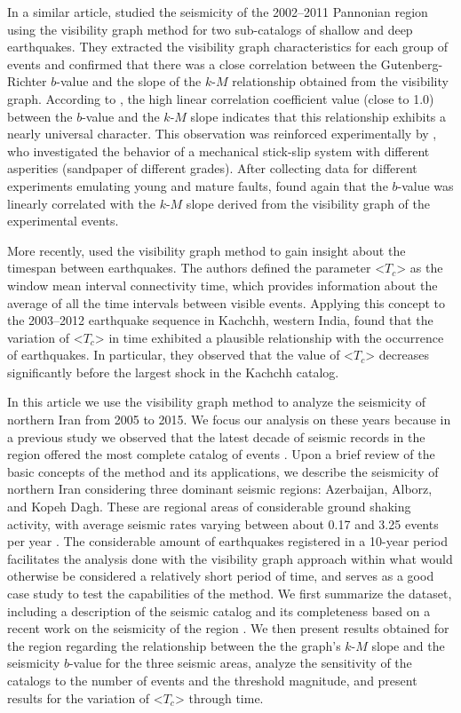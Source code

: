 In a similar article, \citet{Telesca2014} studied the seismicity of the 2002--2011 Pannonian region using the visibility graph method for two sub-catalogs of shallow and deep earthquakes. They extracted the visibility graph characteristics for each group of events and confirmed that there was a close correlation between the Gutenberg-Richter $b$-value and the slope of the $k$-$M$ relationship obtained from the visibility graph. According to \citet{Telesca2014}, the high linear correlation coefficient value (close to 1.0) between the $b$-value and the $k$-$M$ slope indicates that this relationship exhibits a nearly universal character. This observation was reinforced experimentally by \citet{Telesca2014-pone}, who investigated the behavior of a mechanical stick-slip system with different asperities (sandpaper of different grades). After collecting data for different experiments emulating young and mature faults, \citet{Telesca2014-pone} found again that the $b$-value was linearly correlated with the $k$-$M$ slope derived from the visibility graph of the experimental events.

More recently, \citet{Telesca2016} used the visibility graph method to gain insight about the timespan between earthquakes. The authors defined the parameter <$T_c$> as the window mean interval connectivity time, which provides information about the average of all the time intervals between visible events. Applying this concept to the 2003--2012 earthquake sequence in Kachchh, western India, \citet{Telesca2016} found that the variation of <$T_c$> in time exhibited a plausible relationship with the occurrence of earthquakes. In particular, they observed that the value of <$T_c$> decreases significantly before the largest shock in the Kachchh catalog.

In this article we use the visibility graph method to analyze the seismicity of northern Iran from 2005 to 2015. We focus our analysis on these years because in a previous study we observed that the latest decade of seismic records in the region offered the most complete catalog of events \citep[e.g.][]{Khoshnevis2016}. Upon a brief review of the basic concepts of the method and its applications, we describe the seismicity of northern Iran considering three dominant seismic regions: Azerbaijan, Alborz, and Kopeh Dagh. These are regional areas of considerable ground shaking activity, with average seismic rates varying between about 0.17 and 3.25 events per year \citep[e.g.,][]{Nemati2015}. The considerable amount of earthquakes registered in a 10-year period facilitates the analysis done with the visibility graph approach within what would otherwise be considered a relatively short period of time, and serves as a good case study to test the capabilities of the method. We first summarize the dataset, including a description of the seismic catalog and its completeness based on a recent work on the seismicity of the region \citep{Khoshnevis2016}. We then present results obtained for the region regarding the relationship between the the graph's $k$-$M$ slope and the seismicity $b$-value for the three seismic areas, analyze the sensitivity of the catalogs to the number of events and the threshold magnitude, and present results for the variation of <$T_c$> through time.
